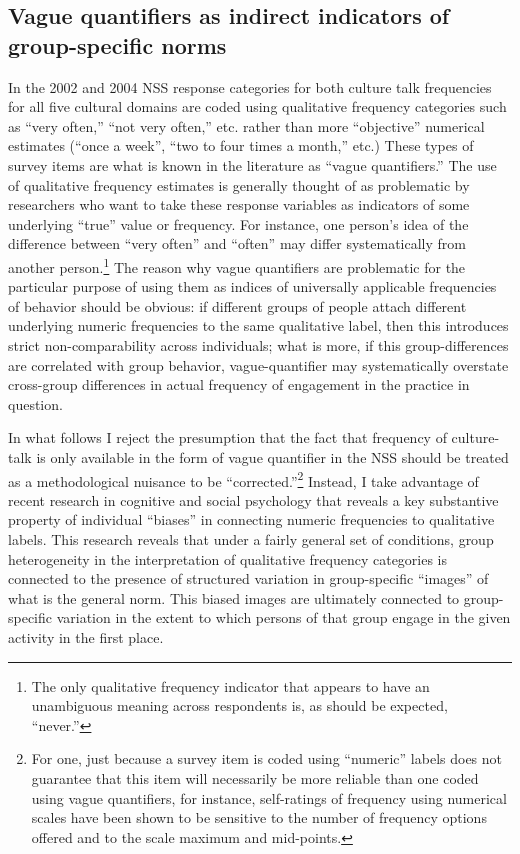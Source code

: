 \documentclass[11pt]{article}
\begin{document}
\subsection{Vague quantifiers as indirect indicators of group-specific norms}
In the 2002 and 2004 NSS response categories for both culture talk frequencies for all five cultural domains are coded using qualitative frequency categories such as ``very often,'' ``not very often,'' etc. rather than more ``objective'' numerical estimates (``once a week'', ``two to four times a month,'' etc.)  These types of survey items are what is known in the literature as ``vague quantifiers.'' The use of qualitative frequency estimates is generally thought of as problematic by researchers who want to take these response variables as indicators of some underlying ``true'' value or frequency.  For instance, one person's idea of the difference between ``very often'' and ``often'' may differ systematically from another person.\footnote{The only qualitative frequency indicator that appears to have an unambiguous meaning across respondents is, as should be expected, ``never.''} The reason why vague quantifiers are problematic for the particular purpose of using them as indices of universally applicable frequencies of behavior should be obvious:  if different groups of people attach different underlying numeric frequencies to the same qualitative label, then this introduces strict non-comparability across individuals; what is more, if this group-differences are correlated with group behavior, vague-quantifier may systematically overstate cross-group differences in actual frequency of engagement in the practice in question.

In what follows I reject the presumption that the fact that frequency of culture-talk is only available in the form of vague quantifier in the NSS should be treated as a methodological nuisance to be ``corrected.''\footnote{For one, just because a survey item is coded using ``numeric'' labels does not guarantee that this item will necessarily be more reliable than one coded using vague quantifiers, for instance, self-ratings of frequency using numerical scales have been shown to be sensitive to the number of frequency options offered and to the scale maximum and mid-points.}  Instead, I take advantage of recent research in cognitive and social psychology that reveals a key substantive property of individual ``biases'' in connecting numeric frequencies to qualitative labels.  This research reveals that under a fairly general set of conditions, group heterogeneity in the interpretation of qualitative frequency categories is connected to the presence of structured variation in group-specific ``images'' of what is the general norm.  This biased images are ultimately connected to group-specific variation in the extent to which persons of that group engage in the given activity in the first place.  
\end{document}
